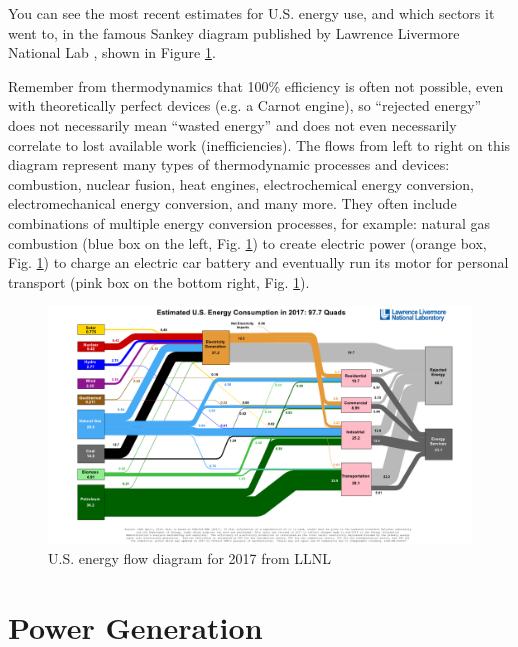 \documentclass[10pt]{article}
\begin{document}
You can see the most recent estimates for U.S. energy use, and which sectors it went to, in the famous Sankey diagram published by Lawrence Livermore National Lab \cite{noauthor_undated-zv}, shown in Figure \ref{sankey}. 

Remember from thermodynamics that 100\% efficiency is often not possible, even with theoretically perfect devices (e.g. a Carnot engine), so ``rejected energy'' does not necessarily mean ``wasted energy'' and does not even necessarily correlate to lost available work (inefficiencies). The flows from left to right on this diagram represent many types of thermodynamic processes and devices: combustion, nuclear fusion, heat engines, electrochemical energy conversion, electromechanical energy conversion, and many more. They often include combinations of multiple energy conversion processes, for example:  natural gas combustion (blue box on the left, Fig. \ref{sankey}) to create electric power (orange box, Fig. \ref{sankey}) to charge an electric car battery and eventually run its motor for personal transport (pink box on the bottom right, Fig. \ref{sankey}).

            \begin{figure}[h]
            \includegraphics[width=7in]{extras03/2017_United-States_Energy.pdf}
            \caption{U.S. energy flow diagram for 2017 from LLNL \cite{noauthor_undated-zv}}
            \label{sankey}
            \end{figure}



\section{Power Generation}

{}
\end{document}

